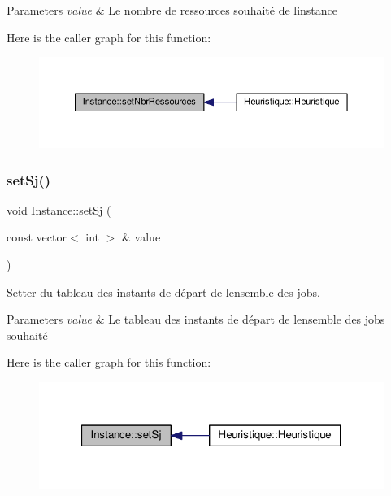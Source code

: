 \begin{DoxyParams}{Parameters}
{\em value} & Le nombre de ressources souhaité de l\textquotesingle{}instance \\
\hline
\end{DoxyParams}
Here is the caller graph for this function\+:\nopagebreak
\begin{figure}[H]
\begin{center}
\leavevmode
\includegraphics[width=350pt]{classInstance_a391acee96072e5ad7270ecdbe8231bd6_icgraph}
\end{center}
\end{figure}
\mbox{\label{classInstance_a8086f6081bf72f4cce29dafcf0fdb5db}} 
\subsubsection{\texorpdfstring{set\+Sj()}{setSj()}}
{\footnotesize\ttfamily void Instance\+::set\+Sj (\begin{DoxyParamCaption}\item[{const vector$<$ int $>$ \&}]{value }\end{DoxyParamCaption})}



Setter du tableau des instants de départ de l\textquotesingle{}ensemble des jobs. 


\begin{DoxyParams}{Parameters}
{\em value} & Le tableau des instants de départ de l\textquotesingle{}ensemble des jobs souhaité \\
\hline
\end{DoxyParams}
Here is the caller graph for this function\+:\nopagebreak
\begin{figure}[H]
\begin{center}
\leavevmode
\includegraphics[width=321pt]{classInstance_a8086f6081bf72f4cce29dafcf0fdb5db_icgraph}
\end{center}
\end{figure}
\mbox{\label{classInstance_a4d3bf921882ce7809cc718200e9cf6e9}} 

